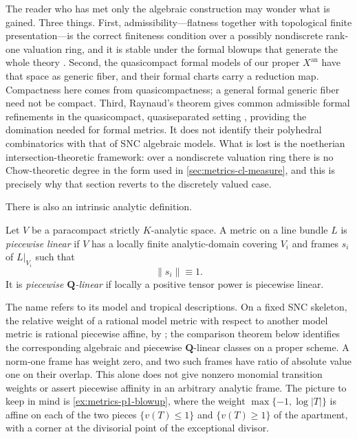 The reader who has met only the algebraic construction may wonder what is
gained. Three things. First, admissibility---flatness together with
topological finite presentation---is the correct finiteness condition over a
possibly nondiscrete rank-one valuation ring, and it is stable under the formal blowups
that generate the whole theory \cite{BoschLutkebohmert1993}. Second, the
quasicompact formal models of our proper $X^{\mathrm{an}}$ have that
space as generic fiber, and their formal charts carry a reduction map.
Compactness here comes from quasicompactness; a general formal generic
fiber need not be compact. Third, Raynaud's theorem gives common admissible
formal refinements in the quasicompact, quasiseparated setting
\cite{BoschLutkebohmert1993}, providing the domination needed for formal
metrics. It does not identify their polyhedral combinatorics with that of
SNC algebraic models. What is lost is
the noetherian intersection-theoretic framework: over a nondiscrete
valuation ring there is no Chow-theoretic degree in the form used in
\cref{sec:metrics-cl-measure}, and
this is precisely why that section reverts to the discretely valued case.

There is also an intrinsic analytic definition.

\begin{definition}
\label{def:metrics-piecewise-linear}
Let $V$ be a paracompact strictly $K$-analytic space. A metric on a line
bundle $L$ is \emph{piecewise linear} if $V$ has a locally finite
analytic-domain covering $V_i$ and frames $s_i$ of $L|_{V_i}$ such
that
\[
                              \|s_i\|\equiv1.
\]
It is \emph{piecewise $\mathbf Q$-linear} if locally a positive tensor
power is piecewise linear.
\end{definition}

The name refers to its model and tropical descriptions. On a fixed SNC
skeleton, the relative weight of a rational model metric with respect to
another model metric is rational piecewise affine, by
; the
comparison theorem below identifies the corresponding algebraic and
piecewise $\mathbf Q$-linear classes on a proper scheme. A norm-one
frame has weight zero, and two such frames have ratio of absolute value
one on their overlap. This alone does not give nonzero monomial transition
weights or assert piecewise affinity in an arbitrary analytic frame.
The picture to keep in mind is \cref{ex:metrics-p1-blowup}, where the weight
$\max\{-1,\log|T|\}$ is affine on each of the two pieces
$\{v(T)\le1\}$ and $\{v(T)\ge1\}$ of the apartment, with a corner at the
divisorial point of the exceptional divisor.

